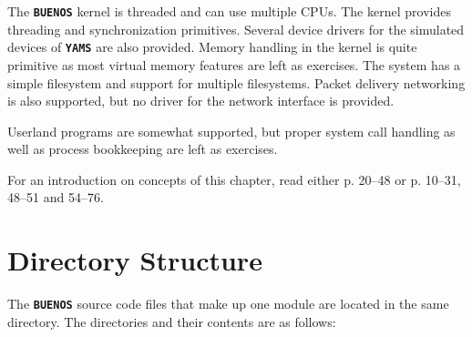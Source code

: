 \documentclass[twoside,a4paper]{report}
\newcommand{\buenos}{\texttt{\textbf{BUENOS}}}
\newcommand{\yams}{\texttt{\textbf{YAMS}}}
\begin{document}
The \buenos{} kernel is threaded and can use multiple CPUs. The kernel
provides threading and synchronization primitives. Several device drivers
for the simulated devices of \yams{} are also provided. Memory
handling in the kernel is quite primitive as most virtual memory
features are left as exercises. The system has a simple filesystem and
support for multiple filesystems. Packet delivery networking is also
supported, but no driver for the network interface is provided.

Userland programs are somewhat supported, but proper system call
handling as well as process bookkeeping are left as exercises.

For an introduction on concepts of this chapter, read either
\cite{tanenbaum} p. 20--48 or \cite{stallings} p. 10--31, 48--51 and 54--76.

\section{Directory Structure}
\label{sec:directory}

The \buenos{} source code files that make up one module are located in
the same directory. The directories and their contents are as follows:
\end{document}
